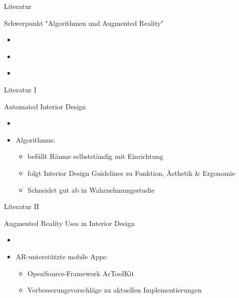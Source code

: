 \documentclass[presentation,bigger,aspectratio=169]{beamer}
\begin{document}
\begin{frame}[label={sec:orgcfd74cd}]{Literatur}
\begin{block}{Schwerpunkt "Algorithmen und Augmented Reality"}
\begin{itemize}
\item \textcite{kanAutomatedInteriorDesign2017}
\item \textcite{sanduAugmentedRealityUses2018}
\item \textcite{moaresInterARInterior2020}
\end{itemize}
\end{block}
\end{frame}

\begin{frame}[label={sec:org5d5ff00}]{Literatur I}
\begin{block}{Automated Interior Design}
\begin{itemize}
\item \textcite{kanAutomatedInteriorDesign2017}
\item Algorithmus:
\begin{itemize}
\item befüllt Räume selbstständig mit Einrichtung
\item folgt Interior Design Guidelines zu Funktion, Ästhetik \& Ergonomie
\item Schneidet gut ab in Wahrnehmungsstudie
\end{itemize}
\end{itemize}
\end{block}
\end{frame}

\begin{frame}[label={sec:org8a7a6d1}]{Literatur II}
\begin{block}{Augmented Reality Uses in Interior Design}
\begin{itemize}
\item \textcite{sanduAugmentedRealityUses2018}
\item AR-unterstützte mobile Apps:
\begin{itemize}
\item OpenSource-Framework ArToolKit
\item Verbesserungsvorschläge zu aktuellen Implementierungen
\end{itemize}
\end{itemize}
\end{block}
\end{frame}
\end{document}
